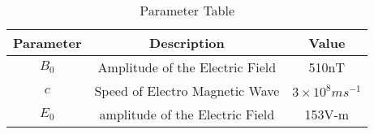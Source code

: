 \begin{table}[H]
    \center

    \begin{tabular}{|c|c|c|}
    \hline
        \textbf{Parameter}&\textbf{Description}&\textbf{Value}\\
        \hline
        $B_0$&Amplitude of the Electric Field&510nT\\
        \hline
        $c$&Speed of Electro Magnetic Wave&$3 \times 10^8 ms^{-1}$ \\
        \hline
        $E_0$ &amplitude of the Electric Field&153V-m \\
        \hline
       \end{tabular} 
    \caption{Parameter Table}

    \label{tab:12.8.7}
\end{table}

